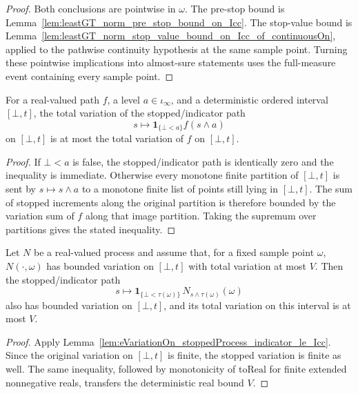 \begin{proof}
Both conclusions are pointwise in \(\omega\).  The pre-stop bound is
Lemma~\ref{lem:leastGT_norm_pre_stop_bound_on_Icc}.  The stop-value bound is
Lemma~\ref{lem:leastGT_norm_stop_value_bound_on_Icc_of_continuousOn}, applied
to the pathwise continuity hypothesis at the same sample point.  Turning these
pointwise implications into almost-sure statements uses the full-measure event
containing every sample point.
\end{proof}


\begin{lemma}\label{lem:eVariationOn_stoppedProcess_indicator_le_Icc}
For a real-valued path \(f\), a level \(a\in\iota_\infty\), and a
deterministic ordered interval \([\bot,t]\), the total variation of the stopped/indicator
path
\[
  s\longmapsto \mathbf 1_{\{\bot<a\}} f(s\wedge a)
\]
on \([\bot,t]\) is at most the total variation of \(f\) on \([\bot,t]\).
\end{lemma}

\begin{proof}
If \(\bot<a\) is false, the stopped/indicator path is identically zero and
the inequality is immediate.  Otherwise every monotone finite partition of
\([\bot,t]\) is sent by \(s\mapsto s\wedge a\) to a monotone finite list of
points still lying in \([\bot,t]\).  The sum of stopped increments along the
original partition is therefore bounded by the variation sum of \(f\) along
that image partition.  Taking the supremum over partitions gives the stated
inequality.
\end{proof}


\begin{lemma}\label{lem:stoppedProcess_indicator_variation_bound_on_Icc}
Let \(N\) be a real-valued process and assume that, for a fixed sample point
\(\omega\), \(N(\cdot,\omega)\) has bounded variation on \([\bot,t]\) with
total variation at most \(V\).  Then the stopped/indicator path
\[
  s\longmapsto
  \mathbf 1_{\{\bot<\tau(\omega)\}}\,
  N_{s\wedge\tau(\omega)}(\omega)
\]
also has bounded variation on \([\bot,t]\), and its total variation on this
interval is at most \(V\).
\end{lemma}

\begin{proof}
Apply
Lemma~\ref{lem:eVariationOn_stoppedProcess_indicator_le_Icc}.  Since the
original variation on \([\bot,t]\) is finite, the stopped variation is finite
as well.  The same inequality, followed by monotonicity of
\(\mathrm{toReal}\) for finite extended nonnegative reals, transfers the
deterministic real bound \(V\).
\end{proof}

